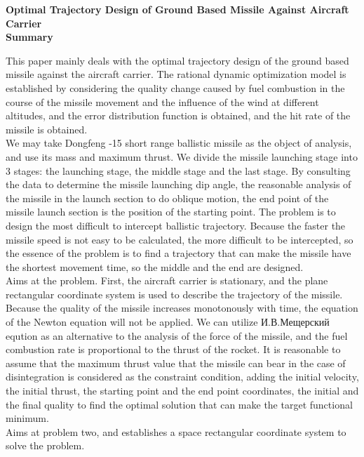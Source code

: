 \documentclass[UTF8]{article}
\begin{document}
\newpage
\thispagestyle{empty}
\begin{center}
\Large
\textbf{Optimal Trajectory Design of Ground Based Missile Against Aircraft Carrier}\\
\normalsize
\textbf{Summary}
\end{center}
\small
This paper mainly deals with the optimal trajectory design of the ground based missile against the aircraft carrier. The rational dynamic optimization model is established by considering the quality change caused by fuel combustion in the course of the missile movement and the influence of the wind at different altitudes, and the error distribution function is obtained, and the hit rate of the missile is obtained.\\
\indent We may take Dongfeng -15 short range ballistic missile as the object of analysis, and use its mass and maximum thrust. We divide the missile launching stage into 3 stages: the launching stage, the middle stage and the last stage. By consulting the data to determine the missile launching dip angle, the reasonable analysis of the missile in the launch section to do oblique motion, the end point of the missile launch section is the position of the starting point. The problem is to design the most difficult to intercept ballistic trajectory. Because the faster the missile speed is not easy to be calculated, the more difficult to be intercepted, so the essence of the problem is to find a trajectory that can make the missile have the shortest movement time, so the middle and the end are designed.\\
\indent Aims at the problem. First, the aircraft carrier is stationary, and the plane rectangular coordinate system is used to describe the trajectory of the missile. Because the quality of the missile increases monotonously with time, the equation of the Newton equation will not be applied. We can utilize И.В.Мещерский eqution as an alternative to the analysis of the force of the missile, and the fuel combustion rate is proportional to the thrust of the rocket. It is reasonable to assume that the maximum thrust value that the missile can bear in the case of disintegration is considered as the constraint condition, adding the initial velocity, the initial thrust, the starting point and the end point coordinates, the initial and the final quality to find the optimal solution that can make the target functional minimum.\\
\indent Aims at problem two, and establishes a space rectangular coordinate system to solve the problem.\\
\end{document}
